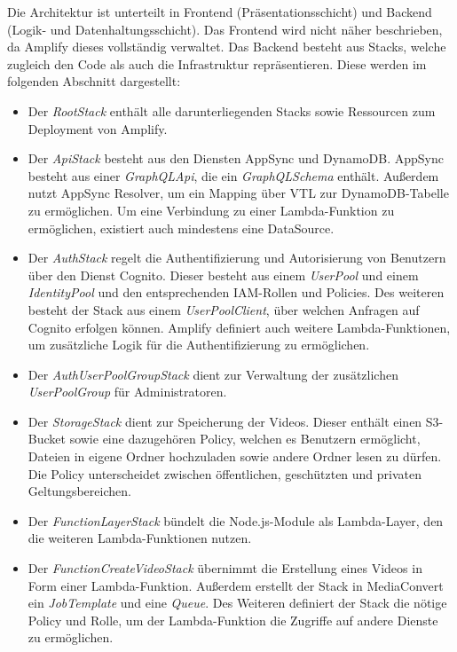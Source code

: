Die Architektur ist unterteilt in Frontend (Präsentationsschicht) und Backend (Logik- und Datenhaltungsschicht). Das Frontend wird nicht näher beschrieben, da Amplify dieses vollständig verwaltet. Das Backend besteht aus Stacks, welche zugleich den Code als auch die Infrastruktur repräsentieren. Diese werden im folgenden Abschnitt dargestellt:
\begin{itemize}
  \item{Der \textit{RootStack} enthält alle darunterliegenden Stacks sowie Ressourcen zum Deployment von Amplify.}

  \item{Der \textit{ApiStack} besteht aus den Diensten AppSync und DynamoDB. AppSync besteht aus einer \textit{GraphQLApi}, die ein \textit{GraphQLSchema} enthält. Außerdem nutzt AppSync Resolver, um ein Mapping über VTL zur DynamoDB-Tabelle zu ermöglichen. Um eine Verbindung zu einer Lambda-Funktion zu ermöglichen, existiert auch mindestens eine DataSource.}

  \item{Der \textit{AuthStack} regelt die Authentifizierung und Autorisierung von Benutzern über den Dienst Cognito. Dieser besteht aus einem \textit{UserPool} und einem \textit{IdentityPool} und den entsprechenden IAM-Rollen und Policies. Des weiteren besteht der Stack aus einem \textit{UserPoolClient}, über welchen Anfragen auf Cognito erfolgen können. Amplify definiert auch weitere Lambda-Funktionen, um zusätzliche Logik für die Authentifizierung zu ermöglichen.}

  \item{Der \textit{AuthUserPoolGroupStack} dient zur Verwaltung der zusätzlichen \textit{UserPoolGroup} für Administratoren.}

  \item{Der \textit{StorageStack} dient zur Speicherung der Videos. Dieser enthält einen S3-Bucket sowie eine dazugehören Policy, welchen es Benutzern ermöglicht, Dateien in eigene Ordner hochzuladen sowie andere Ordner lesen zu dürfen. Die Policy unterscheidet zwischen öffentlichen, geschützten und privaten Geltungsbereichen.}

  \item{Der \textit{FunctionLayerStack} bündelt die Node.js-Module als Lambda-Layer, den die weiteren Lambda-Funktionen nutzen.}

  \item{Der \textit{FunctionCreateVideoStack} übernimmt die Erstellung eines Videos in Form einer Lambda-Funktion. Außerdem erstellt der Stack in MediaConvert ein \textit{JobTemplate} und eine \textit{Queue}. Des Weiteren definiert der Stack die nötige Policy und Rolle, um der Lambda-Funktion die Zugriffe auf andere Dienste zu ermöglichen.}


\end{itemize}
